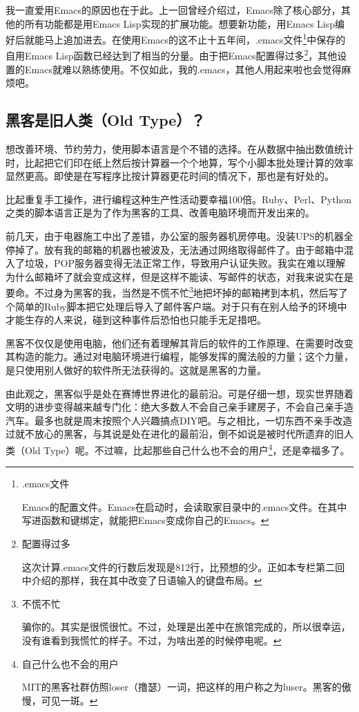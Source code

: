 \documentclass[a4paper,12pt]{article}
\begin{document}
我一直爱用Emacs的原因也在于此。上一回曾经介绍过，Emacs除了核心部分，其他的所有功能都是用Emacs Lisp实现的扩展功能。想要新功能，用Emacs Lisp编好后就能马上追加进去。在使用Emacs的这不止十五年间，.emacs文件\footnote{.emacs文件

Emacs的配置文件。Emacs在启动时，会读取家目录中的.emacs文件。在其中写进函数和键绑定，就能把Emacs变成你自己的Emacs。}中保存的自用Emacs Lisp函数已经达到了相当的分量。由于把Emacs配置得过多\footnote{配置得过多

这次计算.emacs文件的行数后发现是812行，比预想的少。正如本专栏第二回中介绍的那样，我在其中改变了日语输入的键盘布局。}，其他设置的Emacs就难以熟练使用。不仅如此，我的.emacs，其他人用起来啦也会觉得麻烦吧。

\subsection{黑客是旧人类（Old Type）？}

想改善环境、节约劳力，使用脚本语言是个不错的选择。在从数据中抽出数值统计时，比起把它们印在纸上然后按计算器一个个地算，写个小脚本批处理计算的效率显然更高。即使是在写程序比按计算器更花时间的情况下，那也是有好处的。

比起重复手工操作，进行编程这种生产性活动要幸福100倍。Ruby、Perl、Python之类的脚本语言正是为了作为黑客的工具、改善电脑环境而开发出来的。

前几天，由于电器施工中出了差错，办公室的服务器机房停电。没装UPS的机器全停掉了。放有我的邮箱的机器也被波及，无法通过网络取得邮件了。由于邮箱中混入了垃圾，POP服务器变得无法正常工作，导致用户认证失败。我实在难以理解为什么邮箱坏了就会变成这样，但是这样不能读、写邮件的状态，对我来说实在是要命。不过身为黑客的我，当然是不慌不忙\footnote{不慌不忙

骗你的。其实是很慌很忙。不过，处理是出差中在旅馆完成的，所以很幸运，没有谁看到我慌忙的样子。不过，为啥出差的时候停电呢。}地把坏掉的邮箱拷到本机，然后写了个简单的Ruby脚本把它处理后导入了邮件客户端。对于只有在别人给予的环境中才能生存的人来说，碰到这种事件后恐怕也只能手无足措吧。

黑客不仅仅是使用电脑，他们还有着理解其背后的软件的工作原理、在需要时改变其构造的能力。通过对电脑环境进行编程，能够发挥的魔法般的力量；这个力量，是只使用别人做好的软件所无法获得的。这就是黑客的力量。

由此观之，黑客似乎是处在赛博世界进化的最前沿。可是仔细一想，现实世界随着文明的进步变得越来越专门化：绝大多数人不会自己亲手建房子，不会自己亲手造汽车。最多也就是周末按照个人兴趣搞点DIY吧。与之相比，一切东西不亲手改造过就不放心的黑客，与其说是处在进化的最前沿，倒不如说是被时代所遗弃的旧人类（Old Type）呢。不过嘛，比起那些自己什么也不会的用户\footnote{自己什么也不会的用户

MIT的黑客社群仿照loser（撸瑟）一词，把这样的用户称之为luser。黑客的傲慢，可见一斑。}，还是幸福多了。
\end{document}
